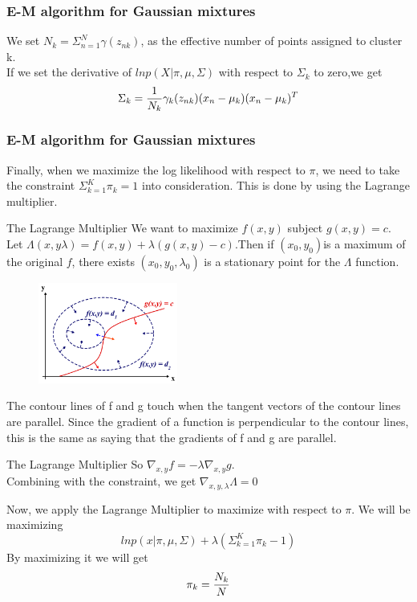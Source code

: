 \documentclass{beamer}
\begin{document}
\begin{frame}
\frametitle{E-M algorithm for Gaussian mixtures}
We set $N_k=\Sigma^{N}_{n=1}\gamma(z_{nk})$, as the effective number of points assigned to cluster k.\\
If we set the derivative of $lnp(X|\pi,\mu,\Sigma)$ with respect to $\Sigma_k$ to zero,we get
\begin{equation}{\label{m2}}
\Sigma_k=\frac{1}{N_k}\gamma_k(z_{nk})(x_n-\mu_k)(x_n-\mu_k)^T
\end{equation}
\end{frame}


\begin{frame}
\frametitle{E-M algorithm for Gaussian mixtures}
Finally, when we maximize the log likelihood with respect to $\pi$, we need to take the constraint $\Sigma_{k=1}^K\pi_k=1$ into consideration.
This is done by using the Lagrange multiplier.
\end{frame}

\begin{frame}
\begin{block}{The Lagrange Multiplier}
We want to maximize $f(x,y)$ subject $g(x,y) = c$.\\
Let $\Lambda(x, y \lambda) = f(x,y) + \lambda (g(x,y)-c)$.Then if $(x_0, y_0)$is a maximum of the original $f$, there exists $(x_0,y_0,\lambda_0)$ is a stationary point for the $\Lambda$ function.\\
\begin{figure}[L]
\includegraphics[width=130pt]{Lagrange.png}
\end{figure}
The contour lines of f and g touch when the tangent vectors of the contour lines are parallel. Since the gradient of a function is perpendicular to the contour lines, this is the same as saying that the gradients of f and g are parallel. 
\end{block}
\end{frame}

\begin{frame}
\begin{block}{The Lagrange Multiplier}
So $\nabla_{x,y}f =  - \lambda \nabla_{x,y}g$.\\
Combining with the constraint, we get $\nabla_{x,y,\lambda}\Lambda = 0$
\end{block}
Now, we apply the Lagrange Multiplier to maximize with respect to $\pi$. We will be maximizing
\begin{equation}
lnp(x|\pi,\mu,\Sigma)+\lambda(\Sigma_{k=1}^K\pi_k-1)
\end{equation}
By maximizing it we will get 
\begin{equation}{\label{m3}}
\pi_k=\frac{N_k}{N}
\end{equation}
\end{frame}
\end{document}
